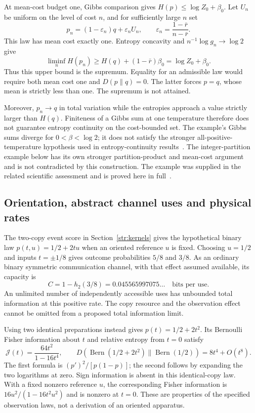 At mean-cost budget one, Gibbs comparison gives $H(p)\le\log Z_0+\beta_0$. Let $U_n$ be uniform on the level of cost $n$, and for sufficiently large $n$ set
\[
 p_n=(1-\varepsilon_n)q+\varepsilon_nU_n,\qquad
 \varepsilon_n=\frac{1-\bar r}{n-\bar r}.
\]
This law has mean cost exactly one. Entropy concavity and $n^{-1}\log g_n\to\log2$ give
\[
 \liminf_n H(p_n)\ge H(q)+(1-\bar r)\beta_0
 =\log Z_0+\beta_0.
\]
Thus this upper bound is the supremum. Equality for an admissible law would require both mean cost one and $D(p\|q)=0$. The latter forces $p=q$, whose mean is strictly less than one. The supremum is not attained.

Moreover, $p_n\to q$ in total variation while the entropies approach a value strictly larger than $H(q)$. Finiteness of a Gibbs sum at one temperature therefore does not guarantee entropy continuity on the cost-bounded set. The example's Gibbs sums diverge for $0<\beta<\log2$; it does not satisfy the stronger all-positive-temperature hypothesis used in entropy-continuity results~\cite{beckerEntropy}. The integer-partition example below has its own stronger partition-product and mean-cost argument and is not contradicted by this construction. The example was supplied in the related scientific assessment and is proved here in full~\cite{justusAssessment}.

\subsection{Orientation, abstract channel uses and physical rates}
\label{pat:orientation}
The two-copy event score in Section~\ref{str:kernels} gives the hypothetical binary law $p(t,u)=1/2+2tu$ when an oriented reference $u$ is fixed. Choosing $u=1/2$ and inputs $t=\pm1/8$ gives outcome probabilities $5/8$ and $3/8$. As an ordinary binary symmetric communication channel, with that effect assumed available, its capacity is
\[
 C=1-h_2(3/8)=0.045565997075\ldots\quad\text{bits per use}.
\]
An unlimited number of independently accessible uses has unbounded total information at this positive rate. The copy resource and the observation effect cannot be omitted from a proposed total information limit.

Using two identical preparations instead gives $p(t)=1/2+2t^2$. Its Bernoulli Fisher information about $t$ and relative entropy from $t=0$ satisfy
\[
 \mathcal J(t)=\frac{64t^2}{1-16t^4},\qquad
 D(\operatorname{Bern}(1/2+2t^2)\|
 \operatorname{Bern}(1/2))=8t^4+O(t^8).
\]
The first formula is $(p')^2/[p(1-p)]$; the second follows by expanding the two logarithms at zero. Sign information is absent in this identical-copy law. With a fixed nonzero reference $u$, the corresponding Fisher information is
$16u^2/(1-16t^2u^2)$ and is nonzero at $t=0$. These are properties of the specified observation laws, not a derivation of an oriented apparatus.

